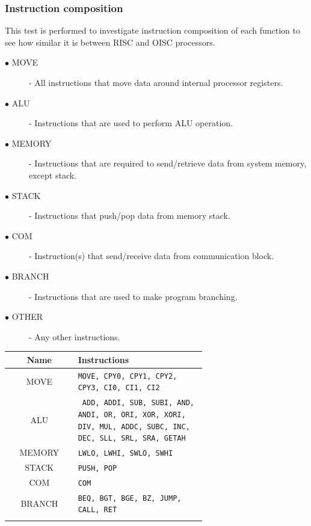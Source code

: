 \subsubsection{Instruction composition}
This test is performed to investigate instruction composition of each function to see how similar it is between RISC and OISC processors. 
\begin{description}
	\item[$\bullet$ MOVE] - All instructions that move data around internal processor registers.
	\item[$\bullet$ ALU] - Instructions that are used to perform ALU operation.
	\item[$\bullet$ MEMORY] - Instructions that are required to send/retrieve data from system memory, except stack.
	\item[$\bullet$ STACK] - Instructions that push/pop data from memory stack.
	\item[$\bullet$ COM] - Instruction(s) that send/receive data from communication block.
	\item[$\bullet$ BRANCH] - Instructions that are used to make program branching.
	\item[$\bullet$ OTHER] - Any other instructions.
\end{description}

\begin{blockpage}
	\begin{tabular}{| c | p{0.65\linewidth} |} \hline 
		\rowcolor[rgb]{0.82,0.82,0.82}
		Name & Instructions \\\hline
		MOVE & \texttt{MOVE, CPY0, CPY1, CPY2, CPY3, CI0, CI1, CI2} \\\hline
		ALU & \texttt{%
			ADD, ADDI,
			SUB, SUBI,
			AND, ANDI,
			OR, ORI,
			XOR, XORI,
			DIV, MUL,
			ADDC, SUBC,
			INC, DEC,
			SLL, SRL, 
			SRA, GETAH
		} \\\hline
		MEMORY & \texttt{LWLO, LWHI, SWLO, SWHI} \\\hline
		STACK  & \texttt{PUSH, POP} \\\hline
		COM & \texttt{COM} \\\hline
		BRANCH & \texttt{BEQ, BGT, BGE, BZ, JUMP, CALL, RET} \\\hline
		\arrayrulecolor[rgb]{0,0,0}\hline
	\end{tabular}
	\label{tab:instr_groups_risc}
\end{blockpage}

